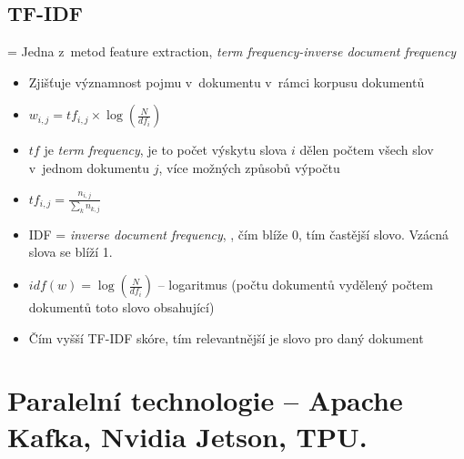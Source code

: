 \subsection{TF-IDF}
= Jedna z~metod feature extraction, \textit{term frequency-inverse document frequency}

\begin{itemize}
    \item Zjišťuje významnost pojmu v~dokumentu v~rámci korpusu dokumentů
    \item \(w_{i,j}=tf_{i,j}\times\log\left(\frac{N}{df_i}\right)\)
    \item \(tf\) je \textit{term frequency}, je to počet výskytu slova \(i\) dělen počtem všech slov v~jednom dokumentu \(j\), více možných způsobů výpočtu
    \item \(tf_{i,j}=\frac{n_{i,j}}{\sum_k n_{k,j}}\)
    \item IDF = \textit{inverse document frequency}, , čím blíže 0, tím častější slovo. Vzácná slova se blíží 1.
    \item \(idf(w)=\log\left(\frac{N}{df_i}\right)\) -- logaritmus (počtu dokumentů vydělený počtem dokumentů toto slovo obsahující)
    \item Čím vyšší TF-IDF skóre, tím relevantnější je slovo pro daný dokument
\end{itemize}

\section{Paralelní technologie – Apache Kafka, Nvidia Jetson, TPU.}

